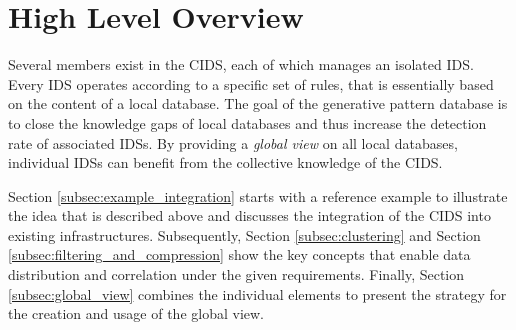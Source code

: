 \section{High Level Overview}\label{sec:high_level_overview}

Several members exist in the CIDS, each of which manages an isolated IDS. Every IDS operates according to a specific set of rules, that is essentially based on the content of a local database. The goal of the generative pattern database is to close the knowledge gaps of local databases and thus increase the detection rate of associated IDSs. By providing a \textit{global view} on all local databases, individual IDSs can benefit from the collective knowledge of the CIDS.

Section \ref{subsec:example_integration} starts with a reference example to illustrate the idea that is described above and discusses the integration of the CIDS into existing infrastructures. Subsequently, Section \ref{subsec:clustering} and Section \ref{subsec:filtering_and_compression} show the key concepts that enable data distribution and correlation under the given requirements. Finally, Section \ref{subsec:global_view} combines the individual elements to present the strategy for the creation and usage of the global view.






